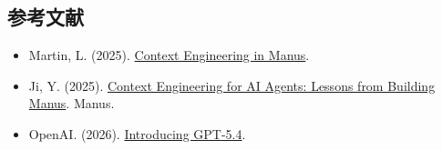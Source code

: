 \hypertarget{ux53c2ux8003ux6587ux732e-127}{%
\subsection{参考文献}\label{ux53c2ux8003ux6587ux732e-127}}

\vspace{0.25em}
\begin{itemize}
\tightlist
\item
  Martin, L. (2025). \href{https://rlancemartin.github.io/2025/10/15/manus/}{Context Engineering in Manus}.
\item
  Ji, Y. (2025). \href{https://manus.im/zh-cn/blog/Context-Engineering-for-AI-Agents-Lessons-from-Building-Manus}{Context Engineering for AI Agents: Lessons from Building Manus}. Manus.
\item
  OpenAI. (2026). \href{https://openai.com/index/introducing-gpt-5-4/}{Introducing GPT-5.4}.
\end{itemize}

\clearpage
